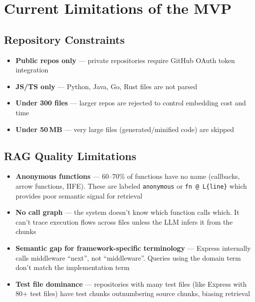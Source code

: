 \documentclass[a4paper,11pt]{article}
\begin{document}
\newpage

\section{Current Limitations of the MVP}

\subsection{Repository Constraints}
\begin{itemize}
    \item \textbf{Public repos only} --- private repositories require GitHub OAuth token integration
    \item \textbf{JS/TS only} --- Python, Java, Go, Rust files are not parsed
    \item \textbf{Under 300 files} --- larger repos are rejected to control embedding cost and time
    \item \textbf{Under 50\,MB} --- very large files (generated/minified code) are skipped
\end{itemize}

\subsection{RAG Quality Limitations}
\begin{itemize}
    \item \textbf{Anonymous functions} --- 60--70\% of functions have no name (callbacks, arrow functions, IIFE). These are labeled \texttt{anonymous} or \texttt{fn @ L\{line\}} which provides poor semantic signal for retrieval
    \item \textbf{No call graph} --- the system doesn't know which function calls which. It can't trace execution flows across files unless the LLM infers it from the chunks
    \item \textbf{Semantic gap for framework-specific terminology} --- Express internally calls middleware ``next'', not ``middleware''. Queries using the domain term don't match the implementation term
    \item \textbf{Test file dominance} --- repositories with many test files (like Express with 80+ test files) have test chunks outnumbering source chunks, biasing retrieval
\end{itemize}
\end{document}
